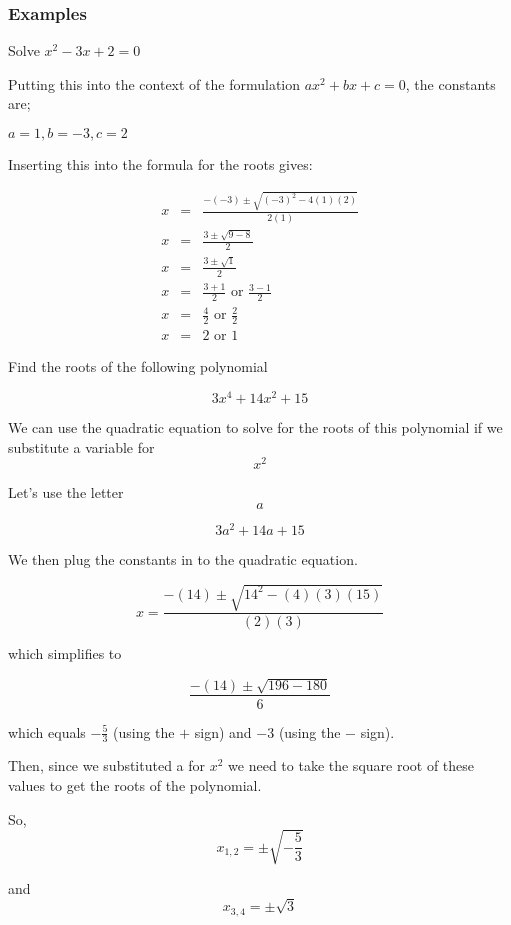 \documentclass[12pt,a4paper]{article}
\theoremstyle{regla}
\theoremstyle{remark}
\theoremstyle{definition}
\theoremstyle{nonumberbreak}
\begin{document}
\subsubsection{Examples}
\begin{xmpl}

Solve $x^2 - 3x + 2 = 0$

Putting this into the context of the formulation $ax^2+bx+c=0$, the constants are;

$a = 1, b = -3 , c = 2$

Inserting this into the formula for the roots gives:

\begin{eqnarray*}
x &=& \frac{-(-3) \pm \sqrt{(-3)^2 - 4(1)(2)}}{2(1)}\\
x &=& \frac{3 \pm \sqrt{9 - 8}}{2}\\
x &=& \frac{3 \pm \sqrt{1}}{2}\\
x &=& \frac{3 + 1}{2} \text{ or } \frac{3 - 1}{2}\\
x &=& \frac{4}{2} \text{ or } \frac{2}{2}\\
x &=& 2 \text{ or } 1 
\end{eqnarray*}

\end{xmpl}
\begin{xmpl}


Find the roots of the following polynomial

$$3x^{4} + 14x^{2} + 15$$

We can use the quadratic equation to solve for the roots of this polynomial if we substitute a variable for $$x^{2}$$

Let's use the letter $$a$$

$$3a^{2} + 14a + 15$$

We then plug the constants in to the quadratic equation.

$$x = \frac{-(14) \pm \sqrt{14^{2} - (4)(3)(15)}}{(2)(3)}$$

which simplifies to

$$\frac{-(14) \pm \sqrt{196 - 180}}{6}$$

which equals $-\frac{5}{3}$ (using the $+$ sign) and $-3$ (using the $-$ sign).

Then, since we substituted a for $x^2$ we need to take the square root of these values to get the roots of the polynomial.

So, $$x_{1,2} = \pm \sqrt{-\frac{5}{3}}$$

and $$x_{3,4} = \pm \sqrt{3}$$
\end{xmpl}
\end{document}
